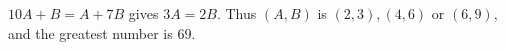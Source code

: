 $ 10A+B=A+7B $ gives $ 3A=2B $. Thus $(A,B)$ is $(2,3),(4,6)$ or $(6,9)$, and the greatest number is $\boxed{69}$.

